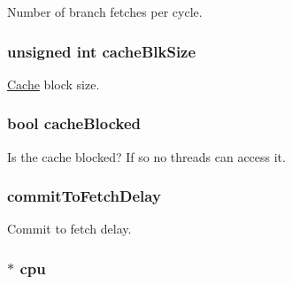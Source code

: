 \label{classDefaultFetch_abceba4006d416e352df47f692b589bc3}
Number of branch fetches per cycle. \hypertarget{classDefaultFetch_a37c69cb65c303fc6e66984fef13f18c6}{
\subsubsection[{cacheBlkSize}]{\setlength{\rightskip}{0pt plus 5cm}unsigned int {\bf cacheBlkSize}}}
\label{classDefaultFetch_a37c69cb65c303fc6e66984fef13f18c6}
\hyperlink{classCache}{Cache} block size. \hypertarget{classDefaultFetch_a12a8dc8b9e94659a01ff979d9d98be89}{
\subsubsection[{cacheBlocked}]{\setlength{\rightskip}{0pt plus 5cm}bool {\bf cacheBlocked}}}
\label{classDefaultFetch_a12a8dc8b9e94659a01ff979d9d98be89}
Is the cache blocked? If so no threads can access it. \hypertarget{classDefaultFetch_a4b0344f5703ba5770b42602c6df63340}{
\subsubsection[{commitToFetchDelay}]{ {\bf commitToFetchDelay}}}
\label{classDefaultFetch_a4b0344f5703ba5770b42602c6df63340}
Commit to fetch delay. \hypertarget{classDefaultFetch_a1379cf882a12ac6fc9eba5da7c84b18b}{
\subsubsection[{cpu}]{$\ast$ {\bf cpu}}}
\label{classDefaultFetch_a1379cf882a12ac6fc9eba5da7c84b18b}
